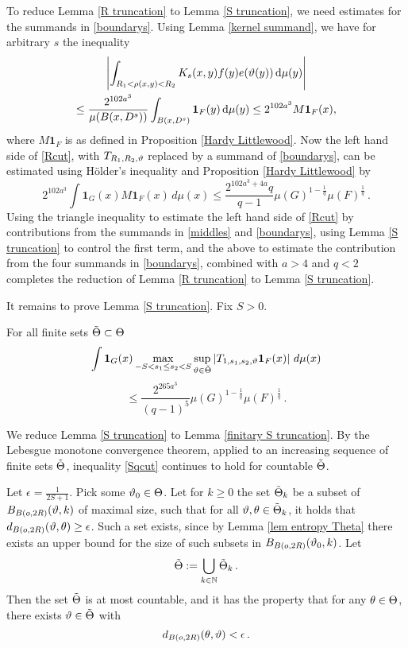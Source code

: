 To reduce Lemma \ref{R truncation} to Lemma \ref{S truncation},  we need estimates for the summands in \eqref{boundarys}. Using Lemma \ref{kernel summand}, we have for arbitrary $s$ the inequality
\begin{multline}
\left|\int_{R_1 <  \rho(x,y) < R_2}  K_s(x,y) f(y) e(\vartheta(y)) \,  \mathrm{d}\mu(y)\right|\\
\leq \frac{2^{102 a^3}}{\mu(B(x, D^{s}))}
 \int_{B(x, D^s)} \mathbf{1}_F(y)  \, \mathrm{d}\mu(y)
\leq 2^{102 a^3} M\mathbf{1}_F(x),
\end{multline}
where $M\mathbf{1}_F$ is as defined in Proposition \ref{Hardy Littlewood}.
Now the left hand side of \eqref{Rcut}, with $T_{R_1,R_2,\vartheta}$ replaced by a summand of \eqref{boundarys}, can be estimated using Hölder's inequality and Proposition \ref{Hardy Littlewood} by
$$
    2^{102 a^3}\int \mathbf{1}_{G}(x) M\mathbf{1}_F(x)\, d\mu(x)
    \leq \frac{2^{102 a^3+4a}q}{q-1}\mu(G)^{1-\frac{1}{q}} \mu(F)^{\frac{1}{q}}\,.
$$
Using the triangle inequality to estimate the left hand side of \eqref{Rcut} by contributions from the summands in \eqref{middles} and \eqref{boundarys}, using Lemma \ref{S truncation} to control the first term, and the above to estimate the contribution from the four summands in \eqref{boundarys}, combined with $a>4$ and $q < 2$ completes the reduction of
Lemma \ref{R truncation} to Lemma \ref{S truncation}.

It remains to prove Lemma \ref{S truncation}. Fix $S>0$.

\begin{lemma}\label{finitary S truncation}
For all finite sets $\tilde{\Theta}\subset \Theta$
$$
    \int \mathbf{1}_{G}(x)
    \max_{-S<s_1\le s_2<S}\sup_{\vartheta\in\tilde{\Theta}}
    \left| T_{1, s_1,s_2,\vartheta} \mathbf{1}_{F}(x) \right|\, d\mu(x)
$$
\begin{equation} \label{Sqcut}
\leq \frac{2^{265a^3}}{(q-1)^5} \mu(G)^{1-\frac{1}{q}} \mu(F)^{\frac{1}{q}}\,.
\end{equation}
\end{lemma}

We reduce Lemma \ref{S truncation} to Lemma \ref{finitary S truncation}.
By the Lebesgue monotone convergence theorem,
applied to an increasing sequence of finite sets $\tilde{\Theta}$, inequality \eqref{Sqcut}
continues to hold for  countable $\tilde{\Theta}$.

Let $\epsilon=\frac{1}{2S+1}$. Pick some $\vartheta_0 \in \Theta$.
Let for $k \ge 0$ the set $\tilde{\Theta}_k$ be a subset of $B_{B(o,2R)}(\vartheta, k)$ of maximal size, such that for all $\vartheta, \theta \in \tilde{\Theta}_k$, it holds that $d_{B(o, 2R)}(\vartheta, \theta) \ge \epsilon$. Such a set exists, since by Lemma \ref{lem entropy Theta} there exists an upper bound for the size of such subsets in $B_{B(o, 2R)}(\vartheta_0, k)$. Let
$$
    \tilde{\Theta} := \bigcup_{k \in \mathbb{N}} \tilde{\Theta}_k\,.
$$
Then the set $\tilde{\Theta}$ is at most countable, and it has the property that for any $\theta \in \Theta$, there exists $\vartheta \in \tilde{\Theta}$ with
$$
    d_{B(o, 2R)}(\theta, \vartheta) < \epsilon\,.
$$

